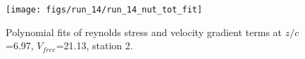 \begin{figure}[H]
\centering
\texttt{[image: figs/run\_14/run\_14\_nut\_tot\_fit]}
\caption{Polynomial fits of reynolds stress and velocity gradient terms at $z/c$=6.97, $V_{free}$=21.13, station 2.}
\label{fig:run_14_nut_tot_fit}
\end{figure}


